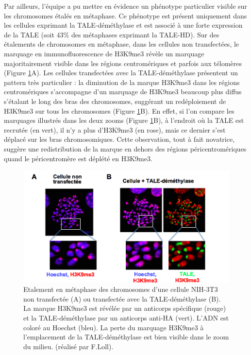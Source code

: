 \documentclass[a4paper,12pt,times]{report}
\newcommand{\scaption}[1]{\caption{\footnotesize{#1}}}
\begin{document}
Par ailleurs, l'équipe a pu mettre en évidence un phénotype particulier visible sur les chromosomes étalés en métaphase. Ce phénotype est présent uniquement dans les cellules exprimant la TALE-déméthylase et est associé à une forte expression de la TALE (soit 43\% des métaphases exprimant la TALE-HD).
Sur des étalements de chromosomes en métaphase, dans les cellules non transfectées, le marquage en immunofluorescence de H3K9me3 révèle un marquage majoritairement visible dans les régions centromériques et parfois aux télomères (Figure \ref{Résultats2}A). Les cellules transfectées avec la TALE-déméthylase présentent un pattern très particulier : la diminution de la marque H3K9me3 dans les régions centromériques s’accompagne d’un marquage de H3K9me3 beaucoup plus diffus s’étalant le long des bras des chromosomes, suggérant un redéploiement de H3K9me3 sur tous les chromosomes (Figure \ref{Résultats2}B).
En effet, si l'on compare les marquages illustrés dans les deux zooms (Figure \ref{Résultats2}B), à l'endroit où la TALE est recrutée (en vert), il n'y a plus d'H3K9me3 (en rose), mais ce dernier s'est déplacé sur les bras chromosomiques.
 Cette observation, tout à fait novatrice, suggère une redistribution de la marque en dehors des régions péricentromériques quand le péricentromère est déplété en H3K9me3.

\begin{figure}[!ht]
\centering 
\includegraphics[scale=0.45]{result.png}
\scaption{ Etalement en métaphase des chromosomes d’une cellule NIH-3T3 non transfectée (A) ou transfectée avec la TALE-déméthylase (B). La marque H3K9me3 est révélée par un anticorps spécifique (rouge) et la TALE-déméthylase par un anticorps anti-HA (vert). L’ADN est coloré au Hoechst (bleu). La perte du marquage H3K9me3 à l’emplacement de la TALE-déméthylase est bien visible dans le zoom du milieu. (réalisé par F.Loll).}
\label{Résultats2}
\end{figure}
\end{document}
